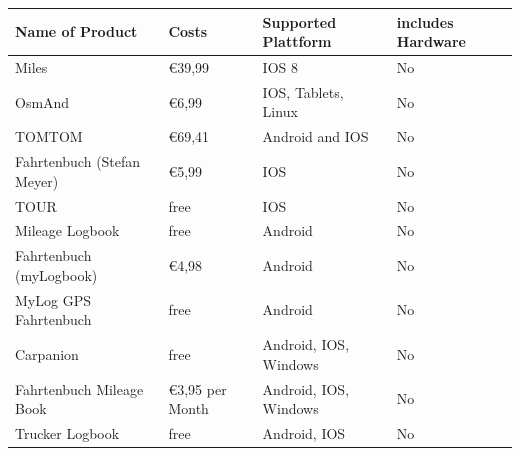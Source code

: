 \begin{tabular}{p{4cm}p{5cm}p{3cm}p{2cm}}
\toprule

  \textbf{Name of Product} & \textbf{Costs} & \textbf{Supported Plattform} & \textbf{includes Hardware} \\
\midrule
  Miles                      & \euro 39,99                                                                                                 & IOS 8                 & No  \\ 
OsmAnd                     & \euro 6,99                                                                                                  & IOS, Tablets, Linux   & No  \\ 
TOMTOM                     & \euro 69,41                                                                                                 & Android and IOS       & No  \\ 
Fahrtenbuch (Stefan Meyer) & \euro 5,99                                                                                                  & IOS                   & No  \\ 
TOUR                       & free                                                                                                        & IOS                   & No  \\ 
Mileage Logbook            & free                                                                                                        & Android               & No  \\ 
Fahrtenbuch (myLogbook)    & \euro 4,98                                                                                                  & Android               & No  \\ 
MyLog GPS Fahrtenbuch      & free                                                                                                        & Android               & No  \\ 
Carpanion                  & free                                                                                                        & Android, IOS, Windows & No  \\ 
Fahrtenbuch Mileage Book   & \euro 3,95 per Month                                                                                        & Android, IOS, Windows & No  \\ 
Trucker Logbook            & free                                                                                                        & Android, IOS          & No  \\ 

\end{tabular}
